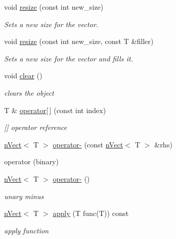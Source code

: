 \begin{DoxyCompactItemize}
void \hyperlink{classnVect_a5d998eac73178b38c0e24a6aa29eacbb}{resize} (const int new\+\_\+size)
\begin{DoxyCompactList}\small\item\em Sets a new size for the vector. \end{DoxyCompactList}\item 
void \hyperlink{classnVect_a58dcec4cc5ea9d8d18e03fb1671bee2b}{resize} (const int new\+\_\+size, const T \&filler)
\begin{DoxyCompactList}\small\item\em Sets a new size for the vector and fills it. \end{DoxyCompactList}\item 
void \hyperlink{classnVect_ad83c522fff7a545b02d20dbf2e99a4e7}{clear} ()
\begin{DoxyCompactList}\small\item\em clears the object \end{DoxyCompactList}\item 
T \& \hyperlink{classnVect_a3fb4c0900764f5b46c402639a1baf01f}{operator\mbox{[}$\,$\mbox{]}} (const int index)
\begin{DoxyCompactList}\small\item\em \mbox{[}\mbox{]} operator reference \end{DoxyCompactList}\item 
\hyperlink{classnVect}{n\+Vect}$<$ T $>$ \hyperlink{classnVect_a2941f0e337b1c7348e8b479539ea715c}{operator-\/} (const \hyperlink{classnVect}{n\+Vect}$<$ T $>$ \&rhs)
\begin{DoxyCompactList}\small\item\em 
\begin{DoxyItemize}
\item operator (binary) 
\end{DoxyItemize}\end{DoxyCompactList}\item 
\hyperlink{classnVect}{n\+Vect}$<$ T $>$ \hyperlink{classnVect_a24677bbe43b1a1f5d77b36e7b96bcb98}{operator-\/} ()
\begin{DoxyCompactList}\small\item\em unary minus \end{DoxyCompactList}\item 
\hyperlink{classnVect}{n\+Vect}$<$ T $>$ \hyperlink{classnVect_a35964beca3a57fad4f69ddd6be16cc91}{apply} (T func(T)) const
\begin{DoxyCompactList}\small\item\em apply function \end{DoxyCompactList}\item 

\end{DoxyCompactItemize}
